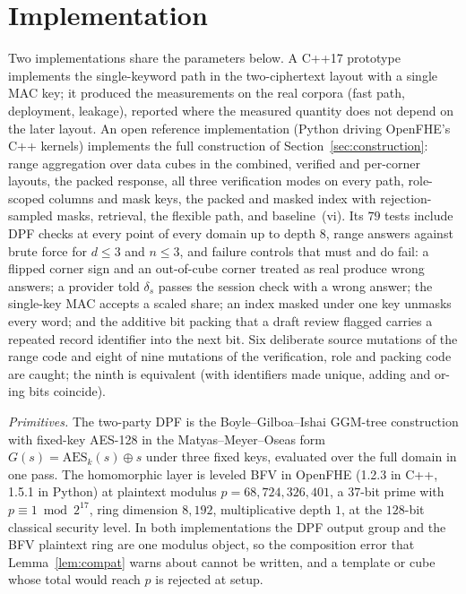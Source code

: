\documentclass[a4paper,fleqn]{cas-sc}
\newif\ifauthorchecks
\newcommand{\authorcheck}[1]{\ifauthorchecks{\color{red}\textsf{[Authors: #1]}}\fi}
\begin{document}
\section{Implementation}
\label{sec:impl}
Two implementations share the parameters below. A C++17 prototype implements
the single-keyword path in the two-ciphertext layout with a single MAC key; it
produced the measurements on the real corpora (fast path, deployment, leakage),
reported where the measured quantity does not depend on the later layout.
\authorcheck{Publish the C++ prototype next to the reference implementation,
and re-measure in it the items marked below.} An open reference implementation
(Python driving OpenFHE's C++ kernels) implements the full construction of
Section~\ref{sec:construction}: range aggregation over data cubes in the
combined, verified and per-corner layouts, the packed response, all three
verification modes on every path, role-scoped columns and mask keys, the packed
and masked index with rejection-sampled masks, retrieval, the flexible path,
and baseline~(vi). Its $79$ tests include DPF checks at every point of every
domain up to depth $8$, range answers against brute force for $d\le3$ and
$n\le3$, and failure controls that must and do fail: a flipped corner sign and
an out-of-cube corner treated as real produce wrong answers; a provider told
$\delta_s$ passes the session check with a wrong answer; the single-key MAC
accepts a scaled share; an index masked under one key unmasks every word; and
the additive bit packing that a draft review flagged carries a repeated record
identifier into the next bit. Six deliberate source mutations of the range code
and eight of nine mutations of the verification, role and packing code are
caught; the ninth is equivalent (with identifiers made unique, adding and
or-ing bits coincide).

\emph{Primitives.} The two-party DPF is the Boyle--Gilboa--Ishai GGM-tree
construction \citep{boyle2016function} with fixed-key AES-128 in the
Matyas--Meyer--Oseas form $G(s)=\mathrm{AES}_k(s)\oplus s$ under three fixed
keys, evaluated over the full domain in one pass. The homomorphic layer is
leveled BFV in OpenFHE \citep{openfhe} (1.2.3 in C++, 1.5.1 in Python) at
plaintext modulus $p=68{,}724{,}326{,}401$, a $37$-bit prime with $p\equiv1
\bmod 2^{17}$, ring dimension $8{,}192$, multiplicative depth $1$, at the
$128$-bit classical security level. In both implementations the DPF output
group and the BFV plaintext ring are one modulus object, so the composition
error that Lemma~\ref{lem:compat} warns about cannot be written, and a
template or cube whose total would reach $p$ is rejected at setup.
\end{document}
